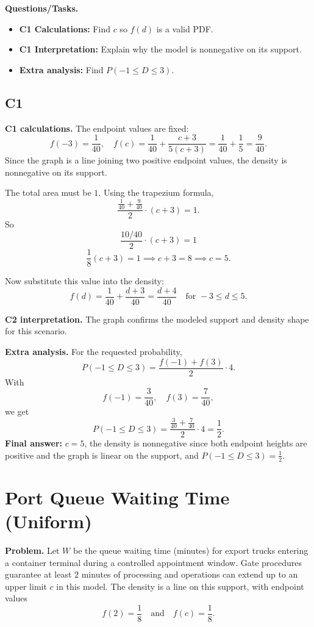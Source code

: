 	\textbf{Questions/Tasks.}
	\begin{itemize}
		\item \textbf{C1 Calculations:} Find $c$ so $f(d)$ is a valid PDF.
		\item \textbf{C1 Interpretation:} Explain why the model is nonnegative on its support.
		\item \textbf{Extra analysis:} Find $P(-1\le D\le 3)$.
	\end{itemize}
	
	\subsection*{C1}
	
	\textbf{C1 calculations.}
	The endpoint values are fixed:
	\[
	f(-3)=\frac{1}{40},\quad f(c)=\frac{1}{40}+\frac{c+3}{5(c+3)}=\frac{1}{40}+\frac15=\frac{9}{40}.
	\]
	Since the graph is a line joining two positive endpoint values, the density is nonnegative on its support.
	
	The total area must be $1$. Using the trapezium formula,
	\[
	\frac{\frac{1}{40}+\frac{9}{40}}{2}\cdot(c+3)=1.
	\]
	So
	\[
	\frac{10/40}{2}\cdot(c+3)=1
	\]
	\[
	\frac{1}{8}(c+3)=1\implies c+3=8\implies c=5.
	\]
	
	Now substitute this value into the density:
	\[
	f(d)=\frac{1}{40}+\frac{d+3}{40}=\frac{d+4}{40}\quad\text{for }-3\le d\le 5.
	\]
	
	\textbf{C2 interpretation.}
	The graph confirms the modeled support and density shape for this scenario.
	
	\textbf{Extra analysis.}
	For the requested probability,
	\[
	P(-1\le D\le3)=\frac{f(-1)+f(3)}{2}\cdot4.
	\]
	With
	\[
	f(-1)=\frac{3}{40},\quad f(3)=\frac{7}{40},
	\]
	we get
	\[
	P(-1\le D\le3)=\frac{\frac{3}{40}+\frac{7}{40}}{2}\cdot4=\frac12.
	\]
	\textbf{Final answer:} $c=5$, the density is nonnegative since both endpoint heights are positive and the graph is linear on the support, and $P(-1\le D\le3)=\frac12$.
	
	\section{Port Queue Waiting Time (Uniform)}
	
	\textbf{Problem.}
	Let $W$ be the queue waiting time (minutes) for export trucks entering a container terminal during a controlled appointment window. Gate procedures guarantee at least $2$ minutes of processing and operations can extend up to an upper limit $c$ in this model. The density is a line on this support, with endpoint values
	\[
	f(2)=\frac18
	\quad\text{and}\quad
	f(c)=\frac18.
	\]
	
